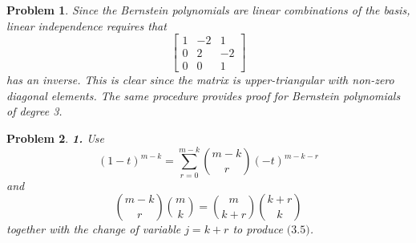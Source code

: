 \documentclass{article}
\newcommand{\subno}[1]{\par\noindent\textbf{#1}}
\theoremstyle{pprop}
\newtheorem{problem}{Problem}[section]
\begin{document}
\begin{problem}
Since the Bernstein polynomials are linear combinations of the basis, linear independence requires that 
$$
\begin{bmatrix}
1 & -2 & 1 \\ 0 & 2 & -2 \\ 0 & 0 & 1
\end{bmatrix}
$$ 
has an inverse. This is clear since the matrix is upper-triangular with non-zero diagonal elements. The same procedure provides 
proof for Bernstein polynomials of degree 3.
\end{problem}
\begin{problem}
\subno{1.} Use
$$
(1-t)^{m-k}=\sum_{r=0}^{m-k}\binom{m-k}{r} (-t)^{m-k-r}
$$
and 
$$
\binom{m-k}{r}\binom{m}{k}=
\binom{m}{k+r}\binom{k+r}{k}
$$
together with the change of variable $j=k+r$ to produce $\text{(3.5)}$.    


\end{problem}
\end{document}
